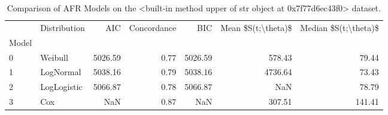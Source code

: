 \begin{table}
\centering
\caption{Comparison of AFR Models on the <built-in method upper of str object at 0x7f77d6ec43f0> dataset.}
\label{tab:cifar100}
\begin{tabular}{llrrrrr}
\toprule
{} & Distribution &     AIC &  Concordance &     BIC &  Mean \$S(t;\textbackslash theta)\$ &  Median \$S(t;\textbackslash theta)\$ \\
Model &              &         &              &         &                     &                       \\
\midrule
0     &      Weibull & 5026.59 &         0.77 & 5026.59 &              578.43 &                 79.44 \\
1     &    LogNormal & 5038.16 &         0.79 & 5038.16 &             4736.64 &                 73.43 \\
2     &  LogLogistic & 5066.87 &         0.78 & 5066.87 &                 NaN &                 78.79 \\
3     &          Cox &     NaN &         0.87 &     NaN &              307.51 &                141.41 \\
\bottomrule
\end{tabular}
\end{table}
